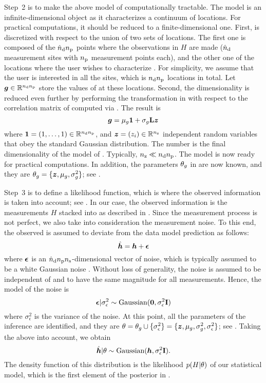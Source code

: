 Step~2 is to make the above model of \g computationally tractable. The model is
an infinite-dimensional object as it characterizes a continuum of locations. For
practical computations, it should be reduced to a finite-dimensional one. First,
\g is discretized with respect to the union of two sets of locations. The first
one is composed of the ${\hat{n}_\mathrm{d}} {n_\mathrm{p}}$ points where the observations in $H$ are made
(${\hat{n}_\mathrm{d}}$ measurement sites with ${n_\mathrm{p}}$ measurement points each), and the other one
of the locations where the user wishes to characterize \g. For simplicity, we
assume that the user is interested in all the sites, which is ${n_\mathrm{d}} {n_\mathrm{p}}$
locations in total. Let $\boldsymbol{g} \in \mathbb{R}^{{n_\mathrm{d}} {n_\mathrm{p}}}$ store the values of \g at
these locations. Second, the dimensionality is reduced even further by
performing the transformation in  with respect to
the correlation matrix of \vg computed via . The
result is
\begin{equation} \elab{inference-reduction}
  \vg = \mu_\g \v{1} + \sigma_\g \m{L} \vz
\end{equation}
where $\boldsymbol{1} = (1, \dots, 1) \in \mathbb{R}^{{n_\mathrm{d}} {n_\mathrm{p}}}$, and $\boldsymbol{z} = (z_i) \in
\mathbb{R}^{n_\mathrm{z}}$ independent random variables that obey the standard Gaussian
distribution. The number \nz is the final dimensionality of the model of \g.
Typically, ${n_\mathrm{z}} \ll {n_\mathrm{d}} {n_\mathrm{p}}$. The model is now ready for practical computations.
In addition, the parameters $\theta_g$ in  are now known, and
they are $\theta_g = \{ \boldsymbol{z}, \mu_g, \sigma^2_g \}$; see
.

Step~3 is to define a likelihood function, which is where the observed
information is taken into account; see . In our case,
the observed information is the measurements $H$ stacked into \hvh as described
in . Since the measurement process is not perfect, we
also take into consideration the measurement noise. To this end, the observed
\hvh is assumed to deviate from the data model prediction \vh as follows:
\[
  \hat{\boldsymbol{h}} = \boldsymbol{h} + \boldsymbol{\epsilon}
\]
where $\boldsymbol{\epsilon}$ is an ${\hat{n}_\mathrm{d}} {n_\mathrm{p}} {n_\mathrm{s}}$-dimensional vector of noise, which is
typically assumed to be a white Gaussian noise \cite{rasmussen2006,
marzouk2009}. Without loss of generality, the noise is assumed to be independent
of \g and to have the same magnitude for all measurements. Hence, the model of
the noise is
\[
  \boldsymbol{\epsilon} | \sigma^2_\epsilon \sim \text{Gaussian}(\boldsymbol{0}, \sigma^2_\epsilon \mathbf{I})
\]
where $\sigma^2_\epsilon$ is the variance of the noise. At this point, all the
parameters of the inference are identified, and they are $\theta = \theta_g \cup \{
\sigma_\epsilon^2 \} = \{ \boldsymbol{z}, \mu_g, \sigma_g^2, \sigma_\epsilon^2 \}$; see
. Taking the above into account, we obtain
\begin{equation} \elab{inference-likelihood}
  \hvh | \t \sim \text{Gaussian}(\vh, \sigma_\epsilon^2 \m{I}).
\end{equation}
The density function of this distribution is the likelihood $p(H | \theta)$ of our
statistical model, which is the first element of the posterior in
.

